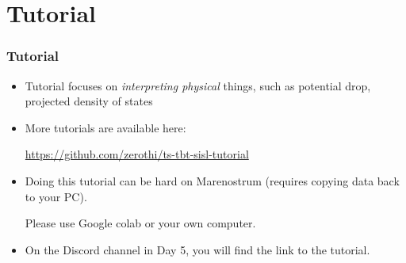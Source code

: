 \section{Tutorial}
\begin{frame}
  \frametitle{Tutorial}

  \begin{itemize}
    \item Tutorial focuses on \emph{interpreting physical} things, such as potential drop, projected
      density of states

    \item More tutorials are available here:

      \url{https://github.com/zerothi/ts-tbt-sisl-tutorial}

    \item Doing this tutorial can be hard on Marenostrum (requires copying data back to
      your PC).

      Please use Google colab or
      your own computer.

    \item On the Discord channel in Day 5, you will find the link to the tutorial.

  \end{itemize}

\end{frame}



